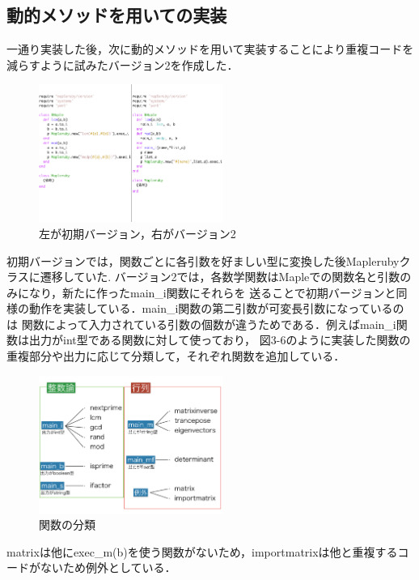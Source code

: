 \subsection{動的メソッドを用いての実装}
一通り実装した後，次に動的メソッドを用いて実装することにより重複コードを減らすように試みたバージョン2を作成した．

\begin{figure}[htbp]\begin{center}
\includegraphics[width=6cm,bb=0 0 442 500]{../figs/./mapleruby_eringi.007.png}
\caption{左が初期バージョン，右がバージョン2}
\label{default}\end{center}\end{figure}
初期バージョンでは，関数ごとに各引数を好ましい型に変換した後Maplerubyクラスに遷移していた.
バージョン2では，各数学関数はMapleでの関数名と引数のみになり，新たに作ったmain\_i関数にそれらを
送ることで初期バージョンと同様の動作を実装している．main\_i関数の第二引数が可変長引数になっているのは
関数によって入力されている引数の個数が違うためである．例えばmain\_i関数は出力がint型である関数に対して使っており，
図3-6のように実装した関数の重複部分や出力に応じて分類して，それぞれ関数を追加している．

\newpage

\begin{figure}[htbp]\begin{center}
\includegraphics[width=6cm,bb=0 0 442 500]{../figs/./mapleruby_eringi.008.png}
\caption{関数の分類}
\label{default}\end{center}\end{figure}
matrixは他にexec\_m(b)を使う関数がないため，importmatrixは他と重複するコードがないため例外としている．

